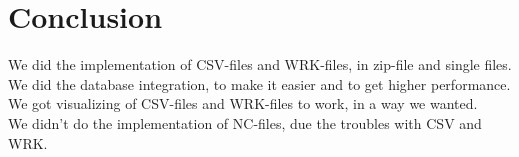 \chapter{Conclusion}
\label{sec:conclusion}
We did the implementation of CSV-files and WRK-files, in zip-file and single files.\\
We did the database integration, to make it easier and to get higher performance.\\
We got visualizing of CSV-files and WRK-files to work, in a way we wanted.\\
We didn't do the implementation of NC-files, due the troubles with CSV and WRK.\\
